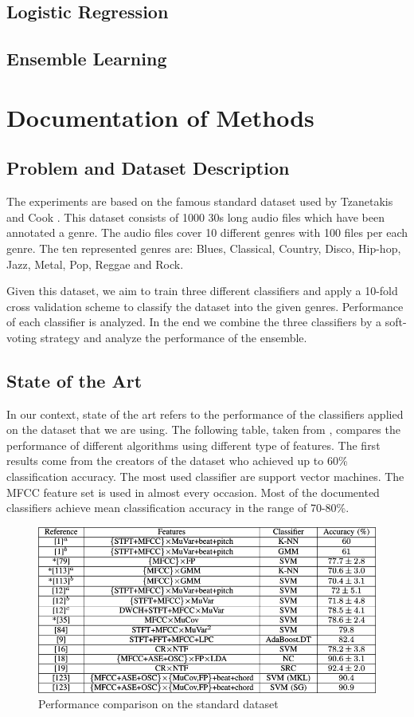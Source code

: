 \documentclass[a4paper,11pt,oneside]{article}
\begin{document}
\subsection{Logistic Regression}
\subsection{Ensemble Learning}
\section{Documentation of Methods}
\subsection{Problem and Dataset Description}
The experiments are based on the famous standard dataset used by Tzanetakis and Cook \cite{tzan}.
This dataset consists of 1000 30s long audio files which have been annotated a genre. 
The audio files cover 10 different genres with 100 files per each genre. The ten represented genres
are: Blues, Classical, Country, Disco, Hip-hop, Jazz, Metal, Pop, Reggae and Rock.

Given this dataset, we aim to train three different classifiers and apply a 10-fold 
cross validation scheme to classify the dataset into the given genres. Performance of 
each classifier is analyzed. In the end we combine the three classifiers by a soft-voting 
strategy and analyze the performance of the ensemble. 
\subsection{State of the Art}
In our context, state of the art refers to the performance of the classifiers applied
on the dataset that we are using. The following table, taken from \cite{survey2}, compares the performance
of different algorithms using different type of features. The first results come from the creators
of the dataset who achieved up to 60\% classification accuracy. The most used classifier are
support vector machines. The MFCC feature set is used in almost every occasion. Most of the documented 
classifiers achieve mean classification accuracy in the range of 70-80\%.
\begin{figure}[H]
  \includegraphics[scale=0.5]{art}
  \centering
  \caption{Performance comparison on the standard dataset}
\end{figure}
\end{document}
